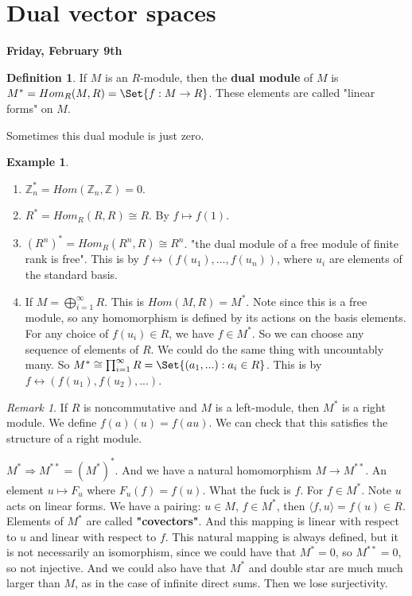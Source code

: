 \documentclass[9pt,reqno,twoside]{amsbook}
\theoremstyle{plain}
\numberwithin{section}{chapter}
\numberwithin{equation}{chapter}
\theoremstyle{definition}
\newtheorem{Def}[theorem]{Definition}
\newtheorem{Ex}[theorem]{Example}
\theoremstyle{remark}
\newtheorem{rem}[theorem]{Remark}
\theoremstyle{plain}
\newcommand{\z}{\mathbb{Z}}
\begin{document}
\section{Dual vector spaces}


\textbf{Friday, February 9th}


\begin{Def} \label{def11.5}
If $M$ is an $R$-module, then the \textbf{dual module} of $M$ is $M^* = Hom_R(M,R) = \Set{f:M \to R}$. These elements are called "linear forms" on $M$. 
\end{Def}

Sometimes this dual module is just zero. 

\begin{Ex}
\begin{enumerate}
\item $\z_n^* = Hom(\z_n,\z) = 0$. 
\item $R^* = Hom_R(R,R) \cong R$. By $f \mapsto f(1)$.
\item $(R^n)^* =Hom_R(R^n,R) \cong R^n$. "the dual module of a free module of finite rank is free". This is by $f \leftrightarrow(f(u_1),...,f(u_n))$, where $u_i$ are elements of the standard basis. 
\item If $M = \bigoplus_{i = 1}^\infty R$. This is $Hom(M,R) = M^*$. Note since this is a free module, so any homomorphism is defined by its actions on the basis elements. For any choice of $f(u_i) \in R$, we have $f \in M^*$. So we can choose any sequence of elements of $R$. We could do the same thing with uncountably many. So $M^* \cong \prod_{i = 1}^\infty R = \Set{(a_1,...):a_i \in R}$. This is by $f \leftrightarrow(f(u_1),f(u_2),...)$. 
\end{enumerate}
\end{Ex}

\begin{rem}
If $R$ is noncommutative and $M$ is a left-module, then $M^*$ is a right module. We define $f(a)(u) = f(au)$. We can check that this satisfies the structure of a right module. 
\end{rem}


$M^* \Rightarrow M^{**} = (M^*)^*$. And we have a natural homomorphism $M \to M^{**}$. An element $u \mapsto F_u$ where $F_u(f) = f(u)$. What the fuck is $f$. For $f \in M^*$. Note $u$ acts on linear forms. We have a pairing: $u \in M$, $f \in M^*$, then $\langle f,u \rangle = f(u) \in R$. Elements of $M^*$ are called \textbf{"covectors"}. And this mapping is linear with respect to $u$ and linear with respect to $f$. This natural mapping is always defined, but it is not necessarily an isomorphism, since we could have that $M^* = 0$, so $M^{**} = 0$, so not injective. And we could also have that $M^*$ and double star are much much larger than $M$, as in the case of infinite direct sums. Then we lose surjectivity. 
\end{document}
